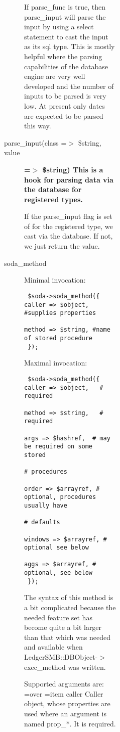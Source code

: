 \begin{description}
\begin{description}
\begin{description}
\begin{description}
\begin{description}
\begin{description}
\begin{description}
\begin{description}
If parse\_func is true, then parse\_input will parse the input by using a select
statement to cast the input as its sql type.  This is mostly helpful where the
parsing capabilities of the database engine are very well developed and the
number of inputs to be parsed is very low.  At present only dates are expected
to be parsed this way.


\item[{parse\_input(class =$>$ \$string, value}] \textbf{=$>$ \$string) This is a hook for parsing data via the database for registered types.}

If the parse\_input flag is set of for the registered type, we cast via the
database.  If not, we just return the value.


\item[{soda\_method}] \mbox{}

Minimal invocation:

\begin{verbatim}
 $soda->soda_method({ caller => $object, #supplies properties
                      method => $string, #name of stored procedure
 });
\end{verbatim}


Maximal invocation:

\begin{verbatim}
 $soda->soda_method({ caller => $object,   # required
                      method => $string,   # required
                        args => $hashref,  # may be required on some stored 
                                           # procedures
                       order => $arrayref, # optional, procedures usually have
                                           # defaults
                     windows => $arrayref, # optional see below
                        aggs => $arrayref, # optional, see below
 });
\end{verbatim}


The syntax of this method is a bit complicated because the needed feature set
has become quite a bit larger than that which was needed and available when
LedgerSMB::DBObject-$>$exec\_method was written.



Supported arguments are:
=over
=item caller
Caller object, whose properties are used where an argument is named prop\_*.  It
is required.



\end{description}
\end{description}
\end{description}
\end{description}
\end{description}
\end{description}
\end{description}
\end{description}
